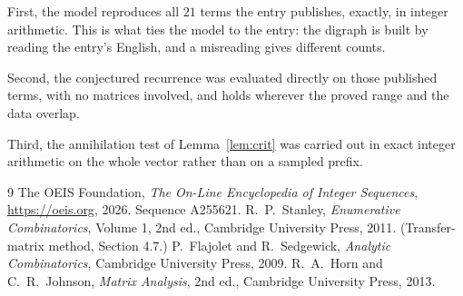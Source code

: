 \documentclass[11pt,a4paper]{article}
\theoremstyle{plain}
\theoremstyle{definition}
\begin{document}
First, the model reproduces all $21$ terms the entry publishes, exactly, in integer
arithmetic. This is what ties the model to the entry: the digraph is built by reading the
entry's English, and a misreading gives different counts.

Second, the conjectured recurrence was evaluated directly on those published terms, with no
matrices involved, and holds wherever the proved range and the data overlap.

Third, the annihilation test of Lemma~\ref{lem:crit} was carried out in exact integer
arithmetic on the whole vector rather than on a sampled prefix.

\begin{thebibliography}{9}
 The OEIS Foundation, \emph{The On-Line Encyclopedia of Integer
Sequences}, \url{https://oeis.org}, 2026. Sequence A255621.
 R.~P.~Stanley, \emph{Enumerative Combinatorics}, Volume 1, 2nd ed.,
Cambridge University Press, 2011. (Transfer-matrix method, Section 4.7.)
 P.~Flajolet and R.~Sedgewick, \emph{Analytic Combinatorics}, Cambridge
University Press, 2009.
 R.~A.~Horn and C.~R.~Johnson, \emph{Matrix Analysis}, 2nd ed., Cambridge
University Press, 2013.
\end{thebibliography}
\end{document}
